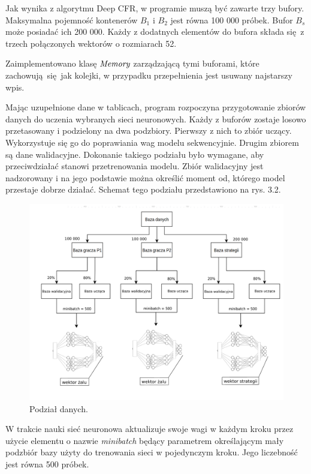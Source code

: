 \documentclass[12pt,oneside,a4paper]{report}
\begin{document}
Jak wynika z algorytmu Deep CFR, w programie muszą być zawarte trzy bufory.
Maksymalna pojemność kontenerów $B_{1}$ i $B_{2}$ jest równa 100 000 próbek.
Bufor $B_{s}$ może posiadać ich 200 000. Każdy z dodatnych elementów do bufora składa się z
trzech połączonych wektorów o rozmiarach 52.

Zaimplementowano klasę $\emph{Memory}$ zarządzającą tymi buforami, które zachowują się jak 
kolejki, w przypadku przepełnienia jest usuwany najstarszy wpis.

Mając uzupełnione dane w tablicach, program rozpoczyna przygotowanie zbiorów danych do uczenia
wybranych
sieci neuronowych. Każdy z buforów zostaje losowo przetasowany i podzielony na dwa podzbiory.
Pierwszy z nich to zbiór uczący. Wykorzystuje się go do poprawiania wag modelu sekwencyjnie.
Drugim zbiorem
są dane walidacyjne. Dokonanie takiego podziału było wymagane, aby przeciwdziałać stanowi
przetrenowania modelu. Zbiór walidacyjny jest nadzorowany i na jego podstawie można określić 
moment od, którego model przestaje dobrze działać. Schemat tego
podziału przedstawiono na rys. 3.2.

\begin{figure}[!ht]
  \centering
  \includegraphics[width=1\textwidth]{./img/bzd.pdf}
  \caption{Podział danych.}
\end{figure}

\vspace{4cm}
W trakcie nauki sieć neuronowa aktualizuje swoje wagi w każdym kroku przez użycie elementu o nazwie
\emph{minibatch} będący parametrem określającym
mały podzbiór bazy użyty do trenowania sieci w pojedynczym kroku. Jego liczebność jest równa 500
próbek.
\end{document}
